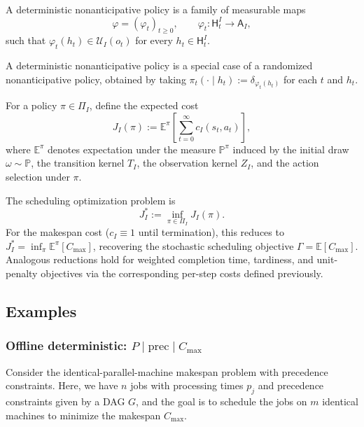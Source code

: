 \begin{definition}\label{def:detpolicy}
A deterministic nonanticipative policy is a family of measurable maps
\[
\varphi = (\varphi_t)_{t \ge 0}, \qquad \varphi_t : \mathsf{H}_t^I \to \mathsf{A}_I,
\]
such that $\varphi_t(h_t) \in \mathcal{U}_I(o_t)$ for every $h_t \in \mathsf{H}_t^I$.
\end{definition}

\begin{remark}
A deterministic nonanticipative policy is a special case of a randomized nonanticipative
policy, obtained by taking $\pi_t(\cdot \mid h_t) := \delta_{\varphi_t(h_t)}$ for each
$t$ and $h_t$.
\end{remark}

\begin{definition}
\label{def:policyvalue}
For a policy $\pi \in \Pi_I$, define the expected cost
\[
J_I(\pi) := \mathbb{E}^{\pi}\!\left[\sum_{t=0}^{\infty} c_I(s_t, a_t)\right],
\]
where $\mathbb{E}^{\pi}$ denotes expectation under the measure $\mathbb{P}^{\pi}$
induced by the initial draw $\omega \sim \mathbb{P}$, the transition kernel $T_I$, the
observation kernel $Z_I$, and the action selection under $\pi$.

The scheduling optimization problem is
\[
J_I^* := \inf_{\pi \in \Pi_I} J_I(\pi).
\]
For the makespan cost ($c_I \equiv 1$ until termination), this reduces to
$J_I^* = \inf_\pi \mathbb{E}^{\pi}[C_{\max}]$, recovering the stochastic scheduling
objective $\Gamma = \mathbb{E}[C_{\max}]$. Analogous reductions hold for weighted
completion time, tardiness, and unit-penalty objectives via the corresponding per-step
costs defined previously.
\end{definition}

\subsection{Examples}

\subsubsection{Offline deterministic: \(P\mid \mathrm{prec}\mid C_{\max}\)}

Consider the identical-parallel-machine makespan problem with precedence constraints. Here, we have $n$ jobs with processing times $p_j$ and precedence constraints given by a DAG $G$, and the goal is to schedule the jobs on $m$ identical machines to minimize the makespan $C_{\max}$.

